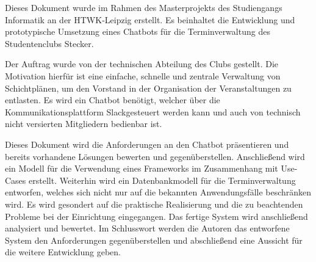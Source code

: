 Dieses Dokument wurde im Rahmen des Masterprojekts des Studiengangs Informatik an der HTWK-Leipzig erstellt. Es beinhaltet die Entwicklung und prototypische Umsetzung eines Chatbots für die Terminverwaltung des Studentenclubs \glqq Stecker\grqq .

Der Auftrag wurde von der technischen Abteilung des Clubs gestellt. Die Motivation hierfür ist eine einfache, schnelle und zentrale Verwaltung von Schichtplänen, um den Vorstand in der Organisation der Veranstaltungen zu entlasten.
Es wird ein Chatbot benötigt, welcher über die Kommunikationsplattform \glqq Slack\grqq gesteuert werden kann und auch von technisch nicht versierten Mitgliedern bedienbar ist.

Dieses Dokument wird die Anforderungen an den Chatbot präsentieren und bereits vorhandene Lösungen bewerten und gegenüberstellen. Anschließend wird ein Modell für die Verwendung eines Frameworks im Zusammenhang mit Use-Cases erstellt. Weiterhin wird ein Datenbankmodell für die Terminverwaltung entworfen, welches sich nicht nur auf die bekannten Anwendungsfälle beschränken wird. Es wird gesondert auf die praktische Realisierung und die zu beachtenden Probleme bei der Einrichtung eingegangen. Das fertige System wird anschließend analysiert und bewertet. Im Schlusswort werden die Autoren das entworfene System den Anforderungen gegenüberstellen und abschließend eine Aussicht für die weitere Entwicklung geben.
